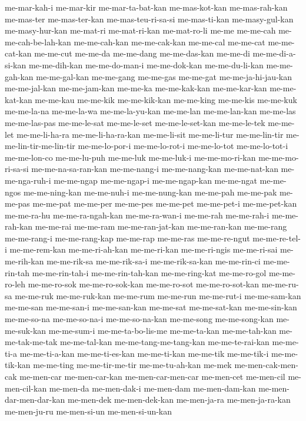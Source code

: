 {me-mar-kah-i me-mar-kir me-mar-ta-bat-kan me-mas-kot-kan me-mas-rah-kan
me-mas-ter me-mas-ter-kan me-mas-teu-ri-sa-si me-mas-ti-kan
me-masy-gul-kan me-masy-hur-kan me-mat-ri me-mat-ri-kan me-mat-ro-li me-me
me-me-cah me-me-cah-be-lah-kan me-me-cah-kan me-me-cak-kan me-me-cal
me-me-cat me-me-cat-kan me-me-cut me-me-da me-me-dang me-me-das-kan
me-me-di me-me-di-a-si-kan me-me-dih-kan me-me-do-man-i me-me-dok-kan
me-me-du-li-kan me-me-gah-kan me-me-gal-kan me-me-gang me-me-gas me-me-gat
me-me-ja-hi-jau-kan me-me-jal-kan me-me-jam-kan me-me-ka me-me-kak-kan
me-me-kar-kan me-me-kat-kan me-me-kau me-me-kik me-me-kik-kan me-me-king
me-me-kis me-me-kuk me-me-la-na me-me-la-wa me-me-la-yu-kan me-me-lan
me-me-lan-kan me-me-las me-me-las-pas me-me-le-sat me-me-le-set
me-me-le-set-kan me-me-le-tek me-me-let me-me-li-ha-ra me-me-li-ha-ra-kan
me-me-li-sit me-me-li-tur me-me-lin-tir me-me-lin-tir-me-lin-tir
me-me-lo-por-i me-me-lo-rot-i me-me-lo-tot me-me-lo-tot-i me-me-lon-co
me-me-lu-puh me-me-luk me-me-luk-i me-me-mo-ri-kan me-me-mo-ri-sa-si
me-me-na-sa-ran-kan me-me-nang-i me-me-nang-kan me-me-nat-kan
me-me-nga-ruh-i me-me-ngap me-me-ngap-i me-me-ngap-kan me-me-ngat
me-me-ngos me-me-ning-kan me-me-nuh-i me-me-nung-kan me-me-pah me-me-pak
me-me-pas me-me-pat me-me-per me-me-pes me-me-pet me-me-pet-i
me-me-pet-kan me-me-ra-hu me-me-ra-ngah-kan me-me-ra-wan-i me-me-rah
me-me-rah-i me-me-rah-kan me-me-rai me-me-ram me-me-ran-jat-kan
me-me-ran-kan me-me-rang me-me-rang-i me-me-rang-kap me-me-rap me-me-ras
me-me-re-ngut me-me-re-tel-i me-me-rem-kan me-me-ri-ah-kan me-me-ri-kan
me-me-ri-ngis me-me-ri-sai me-me-rih-kan me-me-rik-sa me-me-rik-sa-i
me-me-rik-sa-kan me-me-rin-ci me-me-rin-tah me-me-rin-tah-i
me-me-rin-tah-kan me-me-ring-kat me-me-ro-gol me-me-ro-leh me-me-ro-sok
me-me-ro-sok-kan me-me-ro-sot me-me-ro-sot-kan me-me-ru-sa me-me-ruk
me-me-ruk-kan me-me-rum me-me-run me-me-rut-i me-me-sam-kan me-me-san
me-me-san-i me-me-san-kan me-me-sat me-me-sat-kan me-me-sin-kan
me-me-so-na me-me-so-na-i me-me-so-na-kan me-me-song me-me-song-kan
me-me-suk-kan me-me-sum-i me-me-ta-bo-lis-me me-me-ta-kan me-me-tah-kan
me-me-tak-me-tak me-me-tal-kan me-me-tang-me-tang-kan me-me-te-rai-kan
me-me-ti-a me-me-ti-a-kan me-me-ti-es-kan me-me-ti-kan me-me-tik
me-me-tik-i me-me-tik-kan me-me-ting me-me-tir-me-tir me-me-tu-ah-kan
me-mek me-men-cak-men-cak me-men-car me-men-car-kan me-men-car-men-car
me-men-cet me-men-cil me-men-cil-kan me-men-da me-men-dak-i me-men-dam
me-men-dam-kan me-men-dar-men-dar-kan me-men-dek me-men-dek-kan
me-men-ja-ra me-men-ja-ra-kan me-men-ju-ru me-men-si-un me-men-si-un-kan
}
